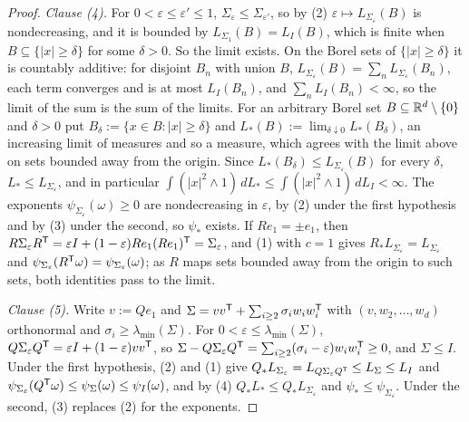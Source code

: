 \begin{proof}
\emph{Clause (4).} For $0 < \varepsilon \le \varepsilon' \le 1$, $\Sigma_\varepsilon \le
\Sigma_{\varepsilon'}$, so by (2) $\varepsilon \mapsto L_{\Sigma_\varepsilon}(B)$ is nondecreasing, and it
is bounded by $L_{\Sigma_1}(B) = L_I(B)$, which is finite when $B \subseteq \{|x| \ge \delta\}$ for some
$\delta > 0$. So the limit exists. On the Borel sets of $\{|x| \ge \delta\}$ it is countably
additive: for disjoint $B_n$ with union $B$, $L_{\Sigma_\varepsilon}(B) = \sum_nL_{\Sigma_\varepsilon}(B_n)$,
each term converges and is at most $L_I(B_n)$, and $\sum_nL_I(B_n) < \infty$, so the limit of the sum
is the sum of the limits. For an arbitrary Borel set $B \subseteq \mathbb{R}^d \setminus \{0\}$ and $\delta > 0$
put $B_\delta := \{x \in B : |x| \ge \delta\}$ and
$L_*(B) := \lim_{\delta\downarrow0}L_*(B_\delta)$, an increasing limit of measures and
so a measure, which agrees with the limit above on sets bounded away from the origin. Since
$L_*(B_\delta) \le L_{\Sigma_\varepsilon}(B)$ for every $\delta$, $L_* \le
L_{\Sigma_\varepsilon}$, and in particular $\int(|x|^2 \wedge 1)\,dL_* \le \int(|x|^2 \wedge 1)\,dL_I <
\infty$. The exponents $\psi_{\Sigma_\varepsilon}(\omega) \ge 0$ are nondecreasing in $\varepsilon$, by (2)
under the first hypothesis and by (3) under the second, so $\psi_*$ exists. If $Re_1 = \pm e_1$, then
$R\Sigma_\varepsilon R^{\mathsf{T}} = \varepsilon I + (1-\varepsilon)Re_1(Re_1)^{\mathsf{T}} = \Sigma_\varepsilon$, and (1)
with $c = 1$ gives $R_*L_{\Sigma_\varepsilon} = L_{\Sigma_\varepsilon}$ and
$\psi_{\Sigma_\varepsilon}(R^{\mathsf{T}}\omega) = \psi_{\Sigma_\varepsilon}(\omega)$; as $R$ maps sets bounded
away from the origin to such sets, both identities pass to the limit.

\emph{Clause (5).} Write $v := Qe_1$ and $\Sigma = vv^{\mathsf{T}} + \sum_{i\ge2}\sigma_iw_iw_i^{\mathsf{T}}$ with
$(v, w_2, \dots, w_d)$ orthonormal and $\sigma_i \ge \lambda_{\min}(\Sigma)$. For
$0 < \varepsilon \le \lambda_{\min}(\Sigma)$, $Q\Sigma_\varepsilon Q^{\mathsf{T}} = \varepsilon I + (1-\varepsilon)vv^{\mathsf{T}}$,
so $\Sigma - Q\Sigma_\varepsilon Q^{\mathsf{T}} = \sum_{i\ge2}(\sigma_i - \varepsilon)w_iw_i^{\mathsf{T}} \ge 0$, and
$\Sigma \le I$. Under the first hypothesis, (2) and (1) give
$Q_*L_{\Sigma_\varepsilon} = L_{Q\Sigma_\varepsilon Q^{\mathsf{T}}} \le L_\Sigma \le L_I$ and
$\psi_{\Sigma_\varepsilon}(Q^{\mathsf{T}}\omega) \le \psi_\Sigma(\omega) \le \psi_I(\omega)$, and by (4)
$Q_*L_* \le Q_*L_{\Sigma_\varepsilon}$ and $\psi_* \le \psi_{\Sigma_\varepsilon}$. Under the second, (3)
replaces (2) for the exponents.
\end{proof}

